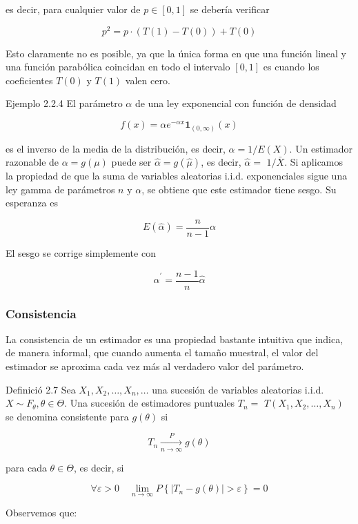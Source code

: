 \documentclass[
]{article}
\begin{document}
es decir, para cualquier valor de \(p \in[0,1]\) se debería verificar

\[
p^{2}=p \cdot(T(1)-T(0))+T(0)
\]

Esto claramente no es posible, ya que la única forma en que una función lineal y una función parabólica coincidan en todo el intervalo \([0,1]\) es cuando los coeficientes \(T(0)\) y \(T(1)\) valen cero.

Ejemplo 2.2.4 El parámetro \(\alpha\) de una ley exponencial con función de densidad

\[
f(x)=\alpha e^{-\alpha x} \mathbf{1}_{(0, \infty)}(x)
\]

es el inverso de la media de la distribución, es decir, \(\alpha=1 / E(X)\).
Un estimador razonable de \(\alpha=g(\mu)\) puede ser \(\hat{\alpha}=g(\hat{\mu})\), es decir, \(\hat{\alpha}=\) \(1 / \bar{X}\). Si aplicamos la propiedad de que la suma de variables aleatorias i.i.d. exponenciales sigue una ley gamma de parámetros \(n\) y \(\alpha\), se obtiene que este estimador tiene sesgo. Su esperanza es

\[
E(\hat{\alpha})=\frac{n}{n-1} \alpha
\]

El sesgo se corrige simplemente con

\[
\hat{\alpha}^{\prime}=\frac{n-1}{n} \hat{\alpha}
\]

\subsubsection{Consistencia}\label{consistencia}

La consistencia de un estimador es una propiedad bastante intuitiva que indica, de manera informal, que cuando aumenta el tamaño muestral, el valor del estimador se aproxima cada vez más al verdadero valor del parámetro.

Definició 2.7 Sea \(X_{1}, X_{2}, \ldots, X_{n}, \ldots\) una sucesión de variables aleatorias i.i.d. \(X \sim F_{\theta}, \theta \in \Theta\). Una sucesión de estimadores puntuales \(T_{n}=\) \(T\left(X_{1}, X_{2}, \ldots, X_{n}\right)\) se denomina consistente para \(g(\theta)\) si

\[
T_{n} \xrightarrow[n \rightarrow \infty]{P} g(\theta)
\]

para cada \(\theta \in \Theta\), es decir, si

\[
\forall \varepsilon>0 \quad \lim _{n \rightarrow \infty} P\left\{\left|T_{n}-g(\theta)\right|>\varepsilon\right\}=0
\]

Observemos que:
\end{document}
